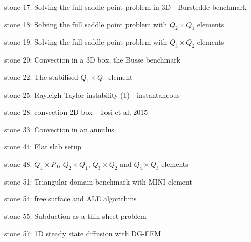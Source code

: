 {\noindent stone 17: Solving the full saddle point problem in 3D - Burstedde benchmark \cite{dobo04} 


\noindent stone 18: Solving the full saddle point problem with $Q_2\times Q_1$ elements 


\noindent stone 19: Solving the full saddle point problem with $Q_3\times Q_2$ elements 


\noindent stone 20: Convection in a 3D box, the Busse benchmark \cite{bucc93}


\noindent stone 22: The stabilised $Q_1 \times Q_1$ element 


\noindent stone 25: Rayleigh-Taylor instability (1) - instantaneous \cite{vaks97}


\noindent stone 28: convection 2D box - Tosi et al, 2015


\noindent stone 33: Convection in an annulus 


\noindent stone 44: Flat slab setup 


\noindent stone 48: $Q_1\times P_0$, $Q_2\times Q_1$, $Q_3\times Q_2$ and $Q_4\times Q_3$ elements


\noindent stone 51: Triangular domain benchmark with MINI element


\noindent stone 54: free surface and ALE algorithms


\noindent stone 55: Subduction as a thin-sheet problem


\noindent stone 57: 1D steady state diffusion with DG-FEM


}
